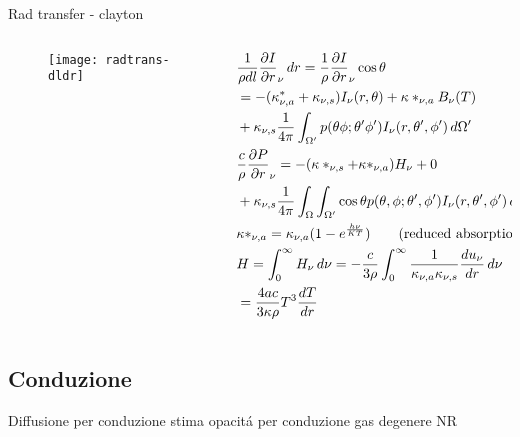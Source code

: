 \begin{frame}{Rad transfer - clayton}
\begin{columns}[T]
    \begin{column}{0.4\textwidth}
        \begin{figure}[!ht]
            \centering
            \texttt{[image: radtrans-dldr]}
            \label{fig:clayradransdldr}
        \end{figure}
    \end{column}
    \begin{column}{0.6\textwidth}
        \begin{align*}
            &\frac{1}{\rho dl} \PDy{r}{I}_{\nu}\,dr=\frac{1}{\rho}\PDy{r}{I}_{\nu}\cos{\theta}\\
            &=-(\kappa^*_{\nu,a}+\kappa_{\nu,s})I_{\nu}(r,\theta)+\kappa*_{\nu,a}B_{\nu}(T)\\
            &+\kappa_{\nu,s}\frac{1}{4\pi}\int_{\Omega'}p(\theta\phi;\theta'\phi')I_{\nu}(r,\theta',\phi')\,d\Omega'\\
            &\frac{c}{\rho}\PDy{r}{P}_{\nu}=-(\kappa*_{\nu,s}+\kappa*_{\nu,a})H_{\nu}+0\\
            &+\kappa_{\nu,s}\frac{1}{4\pi}\int_{\Omega}\int_{\Omega'}\cos{\theta}p(\theta,\phi;\theta',\phi')I_{\nu}(r,\theta',\phi')\,d\Omega\,d\Omega'\\
            &\kappa*_{\nu,a}=\kappa_{\nu,a}(1-\exp{\frac{h\nu}{KT}})\tag{reduced absorption}\\
            &H=\int_0^{\infty}H_{\nu}\,d\nu=-\frac{c}{3\rho}\int_0^{\infty}\frac{1}{\kappa_{\nu,a}\kappa_{\nu,s}}\TDy{r}{u_{\nu}}\,d\nu\\
            &=\frac{4ac}{3\kappa\rho}T^3\TDy{r}{T}
        \end{align*}
    \end{column}
\end{columns}

\end{frame}

\subsection{Conduzione}

\begin{frame}{Diffusione per conduzione}
stima opacit\'a per conduzione gas degenere NR
\end{frame}

